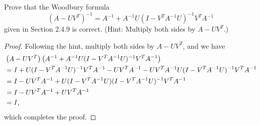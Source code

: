 \begin{pro}
  Prove that the Woodbury formula
  \begin{displaymath}
    (A-UV^T)^{-1} = A^{-1}+A^{-1}U(I-V^TA^{-1}U)^{-1}V^TA^{-1}
  \end{displaymath}
  given in Section 2.4.9 is correct.
  (Hint: Multiply both sides by $A-UV^T$.)
\end{pro}

\begin{proof}
  Following the hint, multiply both sides by $A-UV^T$,
  and we have
  \begin{align*}
    &\left( A-UV^T\right) \left( A^{-1}+A^{-1}U(I-V^TA^{-1}U)^{-1}V^TA^{-1}\right) \\
    &= I + U(I-V^TA^{-1}U)^{-1}V^TA^{-1} - UV^TA^{-1} -
      UV^TA^{-1}U(I-V^TA^{-1}U)^{-1}V^TA^{-1} \\
    &= I -UV^TA^{-1} + U(I-V^TA^{-1}U)(I-V^TA^{-1}U)^{-1}V^TA^{-1} \\
    &= I - UV^TA^{-1} + UV^TA^{-1} \\
    &= I,
  \end{align*}
  which completes the proof.
\end{proof}
